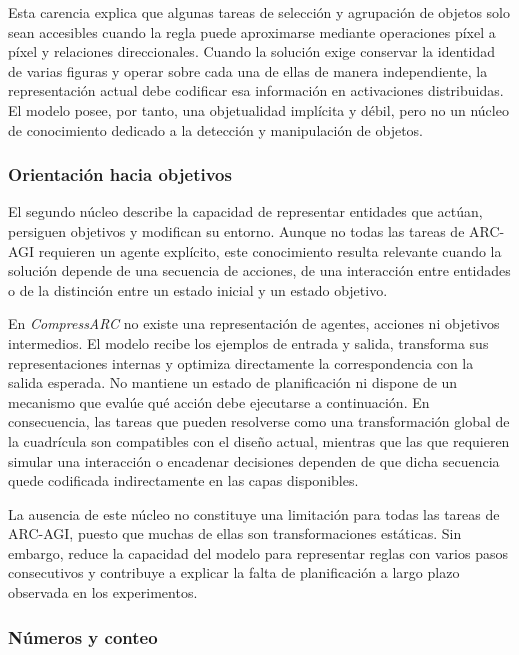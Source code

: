 \documentclass[11pt,a4paper,spanish]{book}
\numberwithin{equation}{chapter}
\numberwithin{figure}{chapter}
\begin{document}
Esta carencia explica que algunas tareas de selección y agrupación de objetos solo sean accesibles cuando la regla
puede aproximarse mediante operaciones píxel a píxel y relaciones direccionales. Cuando la solución exige conservar la identidad de
varias figuras y operar sobre cada una de ellas de manera independiente, la representación actual debe codificar esa información en
activaciones distribuidas. El modelo posee, por tanto, una objetualidad implícita y débil, pero no un núcleo de conocimiento
dedicado a la detección y manipulación de objetos.

\subsubsection{Orientación hacia objetivos}

El segundo núcleo describe la capacidad de representar entidades que actúan, persiguen
objetivos y modifican su entorno. Aunque no todas las tareas de ARC-AGI requieren un agente explícito, este conocimiento resulta
relevante cuando la solución depende de una secuencia de acciones, de una interacción entre entidades o de la distinción entre un
estado inicial y un estado objetivo.

En \textit{CompressARC} no existe una representación de agentes, acciones ni objetivos intermedios. El modelo recibe los ejemplos de entrada
y salida, transforma sus representaciones internas y optimiza directamente la correspondencia con la salida esperada. No mantiene
un estado de planificación ni dispone de un mecanismo que evalúe qué acción debe ejecutarse a continuación. En consecuencia, las
tareas que pueden resolverse como una transformación global de la cuadrícula son compatibles con el diseño actual, mientras que las
que requieren simular una interacción o encadenar decisiones dependen de que dicha secuencia quede codificada indirectamente en las
capas disponibles.

La ausencia de este núcleo no constituye una limitación para todas las tareas de ARC-AGI, puesto que muchas de ellas son
transformaciones estáticas. Sin embargo, reduce la capacidad del modelo para representar reglas con varios pasos consecutivos y
contribuye a explicar la falta de planificación a largo plazo observada en los experimentos.

\subsubsection{Números y conteo}
\end{document}
